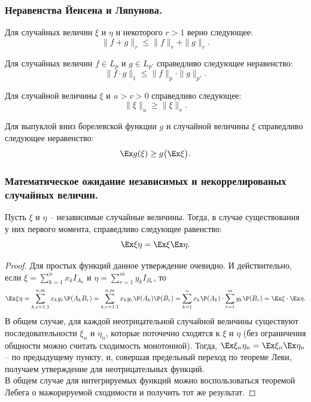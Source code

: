 \subsubsection{Неравенства Йенсена и Ляпунова.}
\begin{theorem}
    Для случайных величин $\xi$ и $\eta$ и некоторого $r > 1$ верно следующее:
    \[
        \|f + g\|_{r} \leq \|f\|_{r} + \|g\|_{r}.
    \]
\end{theorem}
\begin{theorem}
    Для случайных величин $f \in L_p$ и $g \in L_{p'}$ справедливо следующее неравенство:
    \[
        \|f \cdot g\|_{1} \leq \|f\|_{p} \cdot \|g\|_{p'}.
    \]
\end{theorem}
\begin{theorem}
    Для случайной величины $\xi$ и $u > v > 0$ справедливо следующее:
    \[
        \|\xi\|_{u} \geq \|\xi\|_{v}.
    \]
\end{theorem}
\begin{theorem}
    Для выпуклой вниз борелевской функции $g$ и случайной величины $\xi$ справедливо следующее неравенство:
    \[
        \Ex g(\xi) \geq g\bigr(\Ex \xi \bigr).
    \]
\end{theorem}
\subsubsection{Математическое ожидание независимых и некоррелированых случайных величин.}
\begin{theorem}
    Пусть $\xi$ и $\eta$ -- независимые случайные величины.
    Тогда, в случае существования у них первого момента, справедливо следующее равенство:
    \[
        \Ex \xi \eta = \Ex \xi \Ex \eta.
    \]
\end{theorem}
\begin{proof}
    Для простых функций данное утверждение очевидно.
    И действительно, если $\xi = \sum\limits_{k = 1}^{n} x_k I_{A_k}$ и $\eta = \sum\limits_{r = 1}^{m} y_k I_{B_r}$, то
    \[
        \Ex \xi \eta = \sum\limits_{k, r = 1, 1}^{n, m} x_k y_r \P(A_k B_r) = \sum\limits_{k, r = 1, 1}^{n, m} x_k y_r \P(A_k) \P(B_r) = \sum\limits_{k = 1}^n x_k \P(A_k) \cdot \sum\limits_{r = 1}^m y_k \P(B_r) = \Ex \xi \cdot \Ex \eta.
    \]
    В общем случае, для каждой неотрицательной случайной величины существуют последовательности $\xi_n$ и $\eta_n$, которые поточечно сходятся к $\xi$ и $\eta$ (без ограничения общности можно считать сходимость монотонной).
    Тогда, $\Ex \xi_n \eta_n =  \Ex \xi_n \Ex \eta_n$ -- по предыдущему пункту, и, совершая предельный переход по теореме Леви, получаем утверждение для неотрицательных функций. \\
    В общем случае для интегрируемых функций можно воспользоваться теоремой Лебега о мажорируемой сходимости и получить тот же результат.
\end{proof}
